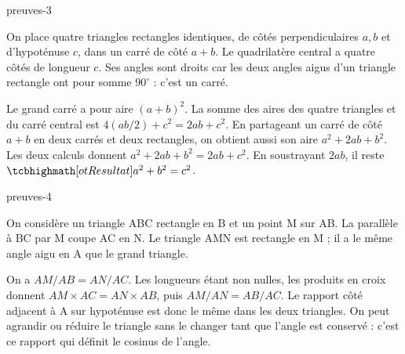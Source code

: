 \begin{blocEdition}{preuves-3}

On place quatre triangles rectangles identiques, de côtés perpendiculaires $a,b$ et d’hypoténuse $c$, dans un carré de côté $a+b$. Le quadrilatère central a quatre côtés de longueur $c$. Ses angles sont droits car les deux angles aigus d’un triangle rectangle ont pour somme $90^\circ$ : c’est un carré.
\label{fig-preuves-3-preuve-pythagore}

Le grand carré a pour aire $(a+b)^2$. La somme des aires des quatre triangles et du carré central est $4(ab/2)+c^2=2ab+c^2$.
En partageant un carré de côté $a+b$ en deux carrés et deux rectangles, on obtient aussi son aire $a^2+2ab+b^2$. Les deux calculs donnent $a^2+2ab+b^2=2ab+c^2$. En soustrayant $2ab$, il reste $\res{a^2+b^2=c^2}$.
\end{blocEdition}
\begin{blocEdition}{preuves-4}

On considère un triangle ABC rectangle en B et un point M sur AB. La parallèle à BC par M coupe AC en N. Le triangle AMN est rectangle en M ; il a le même angle aigu en A que le grand triangle.
\label{fig-preuves-4-cours-thales}

On a $AM/AB=AN/AC$. Les longueurs étant non nulles, les produits en croix donnent $AM\times AC=AN\times AB$, puis $AM/AN=AB/AC$.
Le rapport côté adjacent à A sur hypoténuse est donc le même dans les deux triangles. On peut agrandir ou réduire le triangle sans le changer tant que l’angle est conservé : c’est ce rapport qui définit le cosinus de l’angle.
\end{blocEdition}
